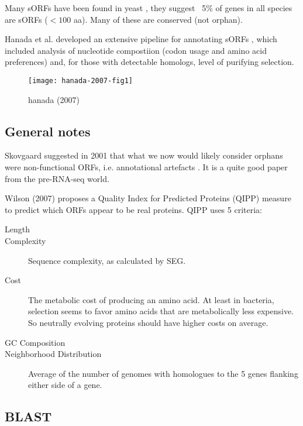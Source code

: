   Many sORFs have been found in yeast \cite{kastenmayer_functional_2006}, they
  suggest ~5\% of genes in all species are sORFs ($<100$ aa). Many of these are
  conserved (not orphan).

  Hanada et al. developed an extensive pipeline for annotating sORFs
  \cite{hanada_large_2007}, which included analysis of nucleotide compostiion
  (codon usage and amino acid preferences) and, for those with detectable
  homologs, level of purifying selection.

  \begin{figure}[!hbpt] \centering
      \texttt{[image: hanada-2007-fig1]}
      \caption{hanada (2007) \cite{hanada_large_2007}}
  \end{figure}
  \FloatBarrier

\subsection{General notes}
Skovgaard suggested in 2001 that what we now would likely consider orphans
were non-functional ORFs, i.e. annotational artefacts
\cite{skovgaard_total_2001}. It is a quite good paper from the pre-RNA-seq
world.

Wilson (2007) \cite{wilson_large-scale_2007} proposes a Quality Index for
Predicted Proteins (QIPP) measure to predict which ORFs appear to be real
proteins. QIPP uses 5 criteria:

\begin{description}
    \item[Length]

    \item[Complexity] Sequence complexity, as calculated by SEG.

    \item[Cost]The metabolic cost of producing an amino acid. At least in
        bacteria, selection seems to favor amino acids that are
        metabolically less expensive. So neutrally evolving proteins should
        have higher costs on average.

    \item[GC Composition]

    \item[Neighborhood Distribution]Average of the number of genomes with
        homologues to the 5 genes flanking either side of a gene.
\end{description}


\subsection{BLAST}

